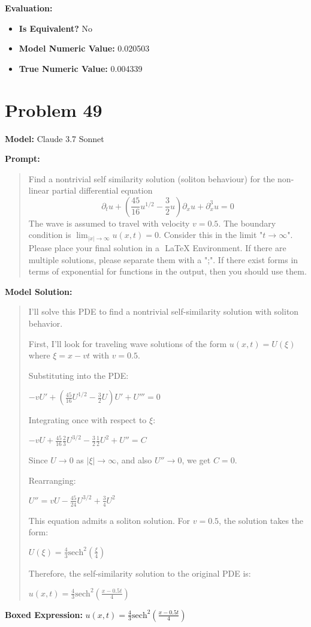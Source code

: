 \documentclass{article}
\begin{document}
\textbf{Evaluation:}
\begin{itemize}
\item \textbf{Is Equivalent?} No
\item \textbf{Model Numeric Value:} 0.020503
\item \textbf{True Numeric Value:} 0.004339
\end{itemize}
\vspace{1cm}
\section*{Problem 49}
\textbf{Model:} Claude 3.7 Sonnet

\textbf{Prompt:}
\begin{quote}
Find a nontrivial self similarity solution (soliton behaviour) for the non-linear partial differential equation $$ \partial_t u + \left(\frac{45}{16} u^{1/2} - \frac{3}{2} u\right)\partial_x u + \partial_x^3 u=0 $$ The wave is assumed to travel with velocity $v=0.5$. The boundary condition is $\lim_{|x|\to\infty} u(x,t)=0$. Consider this in the limit "$t\rightarrow\infty$". Please place your final solution in a $\boxed{}$ LaTeX Environment. If there are multiple solutions, please separate them with a ";". If there exist forms in terms of exponential for functions in the output, then you should use them.
\end{quote}
\textbf{Model Solution:}
\begin{quote}
I'll solve this PDE to find a nontrivial self-similarity solution with soliton behavior.



First, I'll look for traveling wave solutions of the form $u(x,t) = U(\xi)$ where $\xi = x - vt$ with $v = 0.5$.



Substituting into the PDE:

$-v U' + \left(\frac{45}{16} U^{1/2} - \frac{3}{2}U\right)U' + U''' = 0$



Integrating once with respect to $\xi$:

$-vU + \frac{45}{16}\frac{2}{3}U^{3/2} - \frac{3}{2}\frac{1}{2}U^2 + U'' = C$



Since $U \to 0$ as $|\xi| \to \infty$, and also $U'' \to 0$, we get $C = 0$.



Rearranging:

$U'' = vU - \frac{45}{24}U^{3/2} + \frac{3}{4}U^2$



This equation admits a soliton solution. For $v = 0.5$, the solution takes the form:



$U(\xi) = \frac{4}{3}\text{sech}^2(\frac{\xi}{4})$



Therefore, the self-similarity solution to the original PDE is:



$\boxed{u(x,t) = \frac{4}{3}\text{sech}^2\left(\frac{x-0.5t}{4}\right)}$
\end{quote}
\textbf{Boxed Expression:} $u(x,t) = \frac{4}{3}\text{sech}^2\left(\frac{x-0.5t}{4}\right)$
\end{document}
